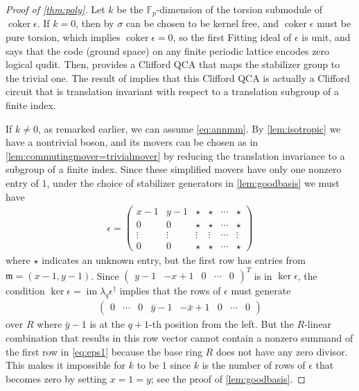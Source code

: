 \documentclass[aps,pra,
floatfix,notitlepage,
nofootinbib,
longbibliography,11pt]{revtex4-1}
\theoremstyle{definition}
\newcommand{\FF}{{\mathbb{F}}}
\DeclareMathOperator{\im}{\mathrm{im}}
\DeclareMathOperator{\coker}{\mathrm{coker}}
\newcommand{\mm}{\mathfrak{m}}
\begin{document}
\begin{proof}[Proof of \cref{thm:poly}]
Let $k$ be the $\FF_p$-dimension of the torsion submodule of $\coker \epsilon$.
If $k=0$, then by \cite[Lem.~7.1]{Haah2013} $\sigma$ can be chosen to be kernel free,
and $\coker \epsilon$ must be pure torsion, which implies $\coker \epsilon = 0$,
so the first Fitting ideal of $\epsilon$ is unit, and \cite[Cor.~4.2]{Haah2013} says
that the code (ground space) on any finite periodic lattice encodes zero logical qudit.
Then, \cite[Thm.~IV.4]{HFH2018} provides a Clifford QCA that maps the stabilizer group to the trivial one.
The result of \cite{haah2019clifford} implies that this Clifford QCA is actually a Clifford circuit
that is translation invariant with respect to a translation subgroup of a finite index.

If $k \neq 0$,
as remarked earlier, we can assume \cref{eq:annmm}.
By \cref{lem:isotropic} we have a nontrivial boson, and its movers can be chosen as in \cref{lem:commutingmover=trivialmover} by reducing the translation invariance to a subgroup of a finite index.
Since these simplified movers have only one nonzero entry of $1$,
under the choice of stabilizer generators in \cref{lem:goodbasis}
we must have 
\begin{align}
\epsilon = \begin{pmatrix}
x - 1 & y-1 &  \star & \star & \cdots & \star \\
0     & 0   &  \star & \star & \cdots & \star \\
\vdots&\vdots& \vdots & \vdots & \cdots & \vdots \\
0     & 0   &  \star & \star & \cdots & \star 
\end{pmatrix} \label{eq:eps1}
\end{align}
where $\star$ indicates an unknown entry, but the first row has entries from $\mm = (x-1,y-1)$.
Since $\begin{pmatrix}
y-1 & -x+1 & 0 & \cdots & 0
\end{pmatrix}^T$
is in $\ker \epsilon$, 
the condition $\ker \epsilon = \im \lambda_q \epsilon^\dagger$ implies that
the rows of $\epsilon$ must generate
\begin{align}
\begin{pmatrix}
0 & \cdots & 0 & \bar y - 1 & -\bar x + 1 & 0 &\cdots & 0
\end{pmatrix} \label{eq:addlrow}
\end{align}
over $R$ where $\bar y -1$ is at the $q+1$-th position from the left.
But the $R$-linear combination that results in this row vector
cannot contain a nonzero summand of the first row in \cref{eq:eps1} 
because the base ring $R$ does not have any zero divisor.
This makes it impossible for $k$ to be $1$
since $k$ is the number of rows of $\epsilon$ that becomes zero by setting $x=1=y$;
see the proof of \cref{lem:goodbasis}.


\end{proof}
\end{document}
